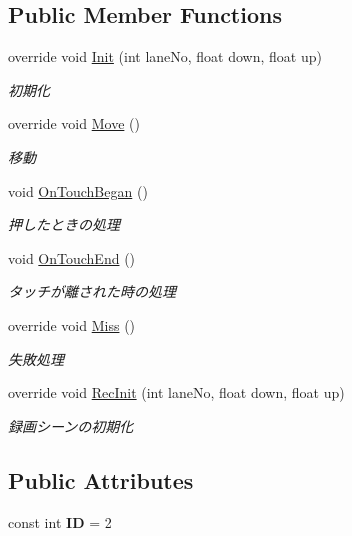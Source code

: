 \subsection*{Public Member Functions}
\begin{DoxyCompactItemize}
\item 
override void \hyperlink{class_long_notes_a080003953680dc4bfa81ef19cabae1c7}{Init} (int lane\+No, float down, float up)
\begin{DoxyCompactList}\small\item\em 初期化 \end{DoxyCompactList}\item 
override void \hyperlink{class_long_notes_a8af8f2d9bd19746a903571ddbde988d9}{Move} ()
\begin{DoxyCompactList}\small\item\em 移動 \end{DoxyCompactList}\item 
void \hyperlink{class_long_notes_a7f87f264cfd9cc1eb4d5eaa48a1c0be2}{On\+Touch\+Began} ()
\begin{DoxyCompactList}\small\item\em 押したときの処理 \end{DoxyCompactList}\item 
void \hyperlink{class_long_notes_a33503ed24d2d1b642424f0c106c5d8e3}{On\+Touch\+End} ()
\begin{DoxyCompactList}\small\item\em タッチが離された時の処理 \end{DoxyCompactList}\item 
override void \hyperlink{class_long_notes_acebb95804b8bb34b709d74b4d97518dd}{Miss} ()
\begin{DoxyCompactList}\small\item\em 失敗処理 \end{DoxyCompactList}\item 
override void \hyperlink{class_long_notes_aefca60d75a0c00f72028f4656400e1d0}{Rec\+Init} (int lane\+No, float down, float up)
\begin{DoxyCompactList}\small\item\em 録画シーンの初期化 \end{DoxyCompactList}\end{DoxyCompactItemize}
\subsection*{Public Attributes}
\begin{DoxyCompactItemize}
\item 
const int {\bfseries ID} = 2\hypertarget{class_long_notes_a9669e9d0f3262d47000660258fbf3dd0}{}\label{class_long_notes_a9669e9d0f3262d47000660258fbf3dd0}

\end{DoxyCompactItemize}
